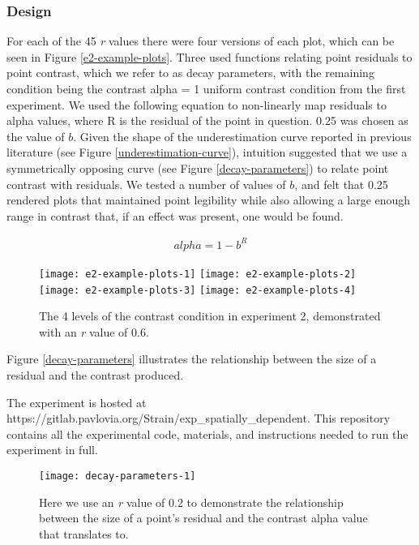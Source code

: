 \documentclass[preprint, 3p,
authoryear]{elsarticle} %
\begin{document}
\hypertarget{design-1}{%
\subsubsection{Design}\label{design-1}}

For each of the 45 \emph{r} values there were four versions of each
plot, which can be seen in Figure \ref{e2-example-plots}. Three used
functions relating point residuals to point contrast, which we refer to
as decay parameters, with the remaining condition being the contrast
alpha = 1 uniform contrast condition from the first experiment. We used
the following equation to non-linearly map residuals to alpha values,
where R is the residual of the point in question. 0.25 was chosen as the
value of \(b\). Given the shape of the underestimation curve reported in
previous literature (see Figure \ref{underestimation-curve}), intuition
suggested that we use a symmetrically opposing curve (see Figure
\ref{decay-parameters}) to relate point contrast with residuals. We
tested a number of values of \(b\), and felt that 0.25 rendered plots
that maintained point legibility while also allowing a large enough
range in contrast that, if an effect was present, one would be found.

\begin{align}
  alpha = 1 - b^R
\end{align}

\begin{figure}

\texttt{[image: e2-example-plots-1]} \texttt{[image: e2-example-plots-2]} \texttt{[image: e2-example-plots-3]} \texttt{[image: e2-example-plots-4]} \hfill{}

\caption{\label{e2-example-plots}The 4 levels of the contrast condition in experiment 2, demonstrated with an \textit{r} value of 0.6.}\label{fig:e2-example-plots}
\end{figure}

Figure \ref{decay-parameters} illustrates the relationship between the
size of a residual and the contrast produced.

The experiment is hosted at
https://gitlab.pavlovia.org/Strain/exp\_spatially\_dependent. This
repository contains all the experimental code, materials, and
instructions needed to run the experiment in full.

\begin{figure}
\texttt{[image: decay-parameters-1]} \caption{\label{decay-parameters}Here we use an \textit{r} value of 0.2 to demonstrate the relationship between the size of a point's residual and the contrast alpha value that translates to.}\label{fig:decay-parameters}
\end{figure}
\end{document}
